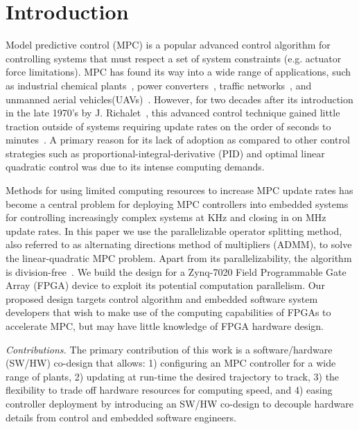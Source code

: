 \section{Introduction}
Model predictive control (MPC) is a popular advanced control algorithm for controlling systems that must respect a set of system constraints (e.g. actuator force limitations). MPC has found its way into a wide range of applications, such as industrial chemical plants~\cite{doi:10.1080/00986445.2011.592446}, power converters~\cite{4682711}, traffic networks~\cite{4602084}, and unmanned aerial vehicles(UAVs)~\cite{1429425}. However, for two decades after its introduction in the late 1970's by J. Richalet~\cite{Richalet1978413}, this advanced control technique gained little traction outside of systems requiring update rates on the order of seconds to minutes~\cite{maciejowski2002}. A primary reason for its lack of adoption as compared to other control strategies such as proportional-integral-derivative (PID) and optimal linear quadratic control was due to its intense computing demands. 

Methods for using limited computing resources to increase MPC update rates has become a central problem for deploying MPC controllers into embedded systems for controlling increasingly complex systems at KHz and closing in on MHz update rates. In this paper we use the parallelizable operator splitting method, also referred to as alternating directions method of multipliers (ADMM), to solve the linear-quadratic MPC problem. Apart from its parallelizability, the algorithm is division-free~\cite{6422363}. We build the design for a Zynq-7020 Field Programmable Gate Array (FPGA) device to exploit its potential computation parallelism. Our proposed design targets control algorithm and embedded software system developers that wish to make use of the computing capabilities of FPGAs to accelerate MPC, but may have little knowledge of FPGA hardware design.

\textit{Contributions.} 
The primary contribution of this work is a software/hardware (SW/HW) co-design that allows: 1) configuring an MPC controller for a wide range of plants, 2) updating at run-time the desired trajectory to track, 3) the flexibility to trade off hardware resources for computing speed, and 4) easing controller deployment by introducing an SW/HW co-design to decouple hardware details from control and embedded software engineers.

